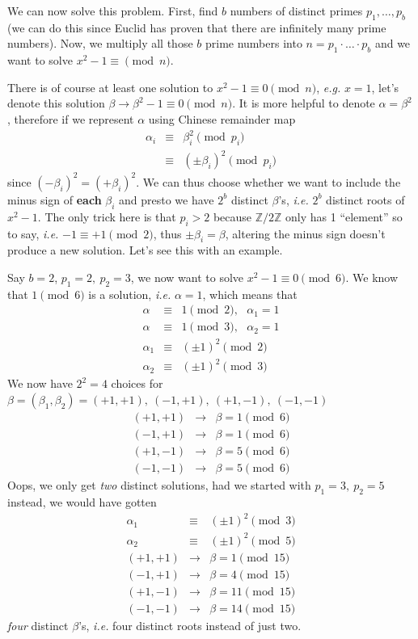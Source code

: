 \documentclass[aps,preprint,preprintnumbers,nofootinbib,showpacs,prd]{revtex4-1}
\newcommand{\ie}{{\it i.e.} }
\newcommand{\eg}{{\it e.g.} }
\newcommand{\nbea}{\begin{eqnarray*}}
\newcommand{\neea}{\end{eqnarray*}}
\begin{document}
We can now solve this problem. First, find $b$ numbers of distinct primes $p_1, \dots, p_b$ (we can do this since Euclid has proven that there are infinitely many prime numbers). Now, we multiply all those $b$ prime numbers into $n = p_1 \cdot \dots \cdot p_b$ and we want to solve $x^2-1 \equiv \pmod{n}$.

There is of course at least one solution to $x^2-1 \equiv 0 \pmod{n}$, \eg $x=1$, let's denote this solution $\beta \to \beta^2 - 1 \equiv 0 \pmod{n}$. It is more helpful to denote $\alpha = \beta^2$, therefore if we represent $\alpha$ using Chinese remainder map
%
\nbea
\alpha_i & \equiv & \beta_i^2 \pmod {p_i} \\
& \equiv & (\pm\beta_i)^2 \pmod {p_i}
\neea
%
since $(-\beta_i)^2 = (+\beta_i)^2$. We can thus choose whether we want to include the minus sign of {\bf each} $\beta_i$ and presto we have $2^b$ distinct $\beta$'s, \ie $2^b$ distinct roots of $x^2-1$. The only trick here is that $p_i > 2$ because $\mathbb{Z}/2\mathbb{Z}$ only has 1 ``element'' so to say, \ie $-1 \equiv +1 \pmod{2}$, thus $\pm \beta_i = \beta$, altering the minus sign doesn't produce a new solution. Let's see this with an example. 

Say $b=2$, $p_1 = 2,~p_2 = 3$, we now want to solve $x^2 - 1 \equiv 0 \pmod{6}$. We know that $1 \pmod {6}$ is a solution, \ie $\alpha = 1$, which means that
%
\nbea
\alpha & \equiv & 1 \pmod{2}, ~~~ \alpha_1 = 1 \\
\alpha & \equiv & 1 \pmod{3}, ~~~ \alpha_2 = 1 \\
\alpha_1 & \equiv & (\pm 1)^2 \pmod{2} \\
\alpha_2 & \equiv & (\pm 1)^2 \pmod{3}
\neea
%
We now have $2^2 = 4$ choices for $\beta=(\beta_1,\beta_2) = (+1,+1),~(-1,+1),~(+1,-1),~(-1,-1)$
%
\nbea
(+1,+1) & \to & \beta = 1 \pmod{6} \\
(-1,+1) & \to & \beta = 1 \pmod{6} \\
(+1,-1) & \to & \beta = 5 \pmod{6} \\
(-1,-1) & \to & \beta = 5 \pmod{6}
\neea
%
Oops, we only get {\it two} distinct solutions, had we started with $p_1 = 3,~p_2 = 5$ instead, we would have gotten
%
\nbea
\alpha_1 & \equiv & (\pm 1)^2 \pmod{3} \\
\alpha_2 & \equiv & (\pm 1)^2 \pmod{5} \\
(+1,+1) & \to & \beta = 1 \pmod{15} \\
(-1,+1) & \to & \beta = 4 \pmod{15} \\
(+1,-1) & \to & \beta = 11 \pmod{15} \\
(-1,-1) & \to & \beta = 14 \pmod{15}
\neea
%
{\it four} distinct $\beta$'s, \ie four distinct roots instead of just two.
\end{document}
